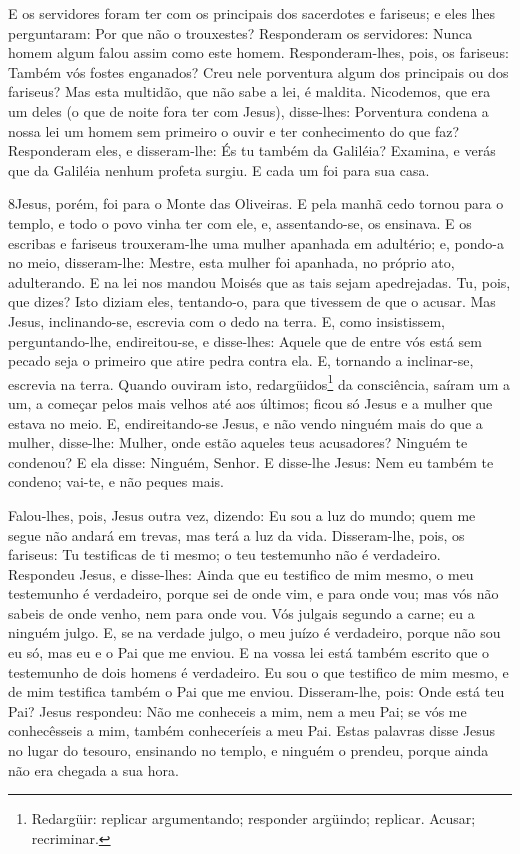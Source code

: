 E os servidores foram ter com os principais dos sacerdotes e
fariseus; e eles lhes perguntaram: Por que não o trouxestes?
Responderam os servidores: Nunca homem algum falou assim como
este homem. Responderam-lhes, pois, os fariseus: Também vós
fostes enganados? Creu nele porventura algum dos principais
ou dos fariseus? Mas esta multidão, que não sabe a lei, é
maldita. Nicodemos, que era um deles (o que de noite fora ter
com Jesus), disse-lhes: Porventura condena a nossa lei um
homem sem primeiro o ouvir e ter conhecimento do que faz?
Responderam eles, e disseram-lhe: És tu também da Galiléia?
Examina, e verás que da Galiléia nenhum profeta surgiu. E
cada um foi para sua casa.

\medskip

\lettrine{8} Jesus, porém, foi para o Monte das Oliveiras.
E pela manhã cedo tornou para o templo, e todo o povo vinha ter
com ele, e, assentando-se, os ensinava. E os escribas e fariseus
trouxeram-lhe uma mulher apanhada em adultério; e, pondo-a no
meio, disseram-lhe: Mestre, esta mulher foi apanhada, no próprio
ato, adulterando. E na lei nos mandou Moisés que as tais sejam
apedrejadas. Tu, pois, que dizes? Isto diziam eles, tentando-o,
para que tivessem de que o acusar. Mas Jesus, inclinando-se,
escrevia com o dedo na terra. E, como insistissem,
perguntando-lhe, endireitou-se, e disse-lhes: Aquele que de entre
vós está sem pecado seja o primeiro que atire pedra contra ela.
E, tornando a inclinar-se, escrevia na terra. Quando ouviram
isto, redargüidos\footnote{Redargüir: replicar argumentando;
responder argüindo; replicar. Acusar; recriminar.} da consciência,
saíram um a um, a começar pelos mais velhos até aos últimos; ficou
só Jesus e a mulher que estava no meio. E, endireitando-se
Jesus, e não vendo ninguém mais do que a mulher, disse-lhe: Mulher,
onde estão aqueles teus acusadores? Ninguém te condenou? E
ela disse: Ninguém, Senhor. E disse-lhe Jesus: Nem eu também te
condeno; vai-te, e não peques mais.

Falou-lhes, pois, Jesus outra vez, dizendo: Eu sou a luz do
mundo; quem me segue não andará em trevas, mas terá a luz da vida.
Disseram-lhe, pois, os fariseus: Tu testificas de ti mesmo; o
teu testemunho não é verdadeiro. Respondeu Jesus, e
disse-lhes: Ainda que eu testifico de mim mesmo, o meu testemunho é
verdadeiro, porque sei de onde vim, e para onde vou; mas vós não
sabeis de onde venho, nem para onde vou. Vós julgais segundo
a carne; eu a ninguém julgo. E, se na verdade julgo, o meu
juízo é verdadeiro, porque não sou eu só, mas eu e o Pai que me
enviou. E na vossa lei está também escrito que o testemunho
de dois homens é verdadeiro. Eu sou o que testifico de mim
mesmo, e de mim testifica também o Pai que me enviou.
Disseram-lhe, pois: Onde está teu Pai? Jesus respondeu: Não
me conheceis a mim, nem a meu Pai; se vós me conhecêsseis a mim,
também conheceríeis a meu Pai. Estas palavras disse Jesus no
lugar do tesouro, ensinando no templo, e ninguém o prendeu, porque
ainda não era chegada a sua hora.

